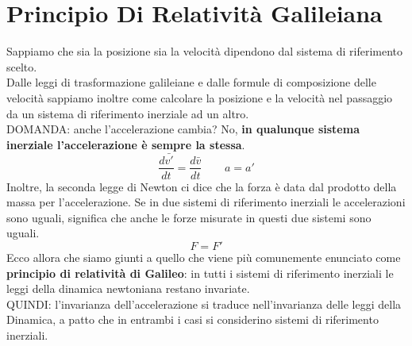\documentclass{article}
\begin{document}
\section{Principio Di Relatività Galileiana}
Sappiamo che sia la posizione sia la velocità dipendono dal sistema di riferimento scelto.\\
Dalle leggi di trasformazione galileiane e dalle formule di composizione delle velocità sappiamo inoltre come calcolare la posizione e la velocità nel passaggio da un sistema di riferimento inerziale ad un altro.\\
DOMANDA: anche l'accelerazione cambia? No, \textbf{in qualunque sistema inerziale l'accelerazione è sempre la stessa}.
\begin{equation}
    \frac{d\bar{v'}}{dt}=\frac{d\bar{v}}{dt}\,\,\,\,\,\,\,\,\,\,\,\ a=a'
\end{equation}
Inoltre, la seconda legge di Newton ci dice che la forza è data dal prodotto della massa per l'accelerazione. Se in due sistemi di riferimento inerziali le accelerazioni sono uguali, significa che anche le forze misurate in questi due sistemi sono uguali.
\begin{equation}
    F=F'
\end{equation}
Ecco allora che siamo giunti a quello che viene più comunemente enunciato come \textbf{principio di relatività di Galileo}: in tutti i sistemi di riferimento inerziali le leggi della dinamica newtoniana restano invariate.\\
QUINDI: l'invarianza dell'accelerazione si traduce nell'invarianza delle leggi della Dinamica, a patto che in entrambi i casi si considerino sistemi di riferimento inerziali.

 
\end{document}
